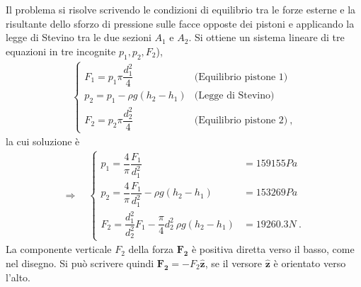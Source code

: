 \documentclass[letterpaper,10pt,italian]{jupyterBook}
\begin{document}
\sphinxAtStartPar
{} Il problema si risolve scrivendo le condizioni di equilibrio tra le
forze esterne e la risultante dello sforzo di pressione sulle facce
opposte dei pistoni e applicando la legge di Stevino tra le due sezioni
\(A_1\) e \(A_2\). Si ottiene un sistema lineare di tre equazioni in tre
incognite \(p_1, p_2, F_2\)),
\begin{equation*}
\begin{split}\begin{cases}
  F_1 = p_1 \pi \dfrac{d_1 ^2}{4} & \text{(Equilibrio pistone 1)} \\
  p_2 = p_1 - \rho g (h_2 - h_1) & \text{(Legge di Stevino)} \\
  F_2 = p_2 \pi \dfrac{d_2 ^2}{4} & \text{(Equilibrio pistone 2)} \ ,
\end{cases}\end{split}
\end{equation*}
\sphinxAtStartPar
la cui soluzione è
\begin{equation*}
\begin{split}\Rightarrow \quad
\begin{cases}
  p_1 = \dfrac{4}{\pi} \dfrac{F_1}{d_1^2}  & = 159155 Pa \\
  p_2 = \dfrac{4}{\pi} \dfrac{F_1}{d_1^2} - \rho g (h_2 - h_1) & = 153269 Pa \\
  F_2 = \dfrac{d_1^2}{d_2^2} F_1 - \dfrac{\pi}{4}d_2^2 \ \rho g (h_2 - h_1) & = 19260.3  N \ .
\end{cases}\end{split}
\end{equation*}
\sphinxAtStartPar
La componente verticale \(F_2\) della forza \(\mathbf{F_2}\) è
positiva diretta verso il basso, come nel disegno. Si può scrivere
quindi \(\mathbf{F_2} = - F_2 \mathbf{\hat{z}}\), se il versore \(\mathbf{\hat{z}}\) è
orientato verso l’alto.

\sphinxstepscope
\end{document}
